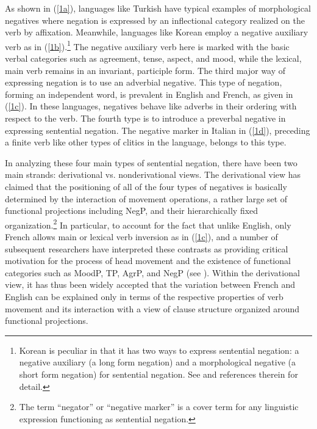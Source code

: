 \documentclass[output=paper
                ,modfonts
                		,nonflat
	        ,collection
	        ,collectionchapter
	        ,collectiontoclongg
 	        ,biblatex
                ,babelshorthands
                ,newtxmath
                ,draftmode
                ,colorlinks, citecolor=brown
]{./langsci/langscibook}
\begin{document}
{\noindent
As shown in (\ref{1a}), languages like Turkish
have typical examples of morphological negatives where
negation is expressed by an inflectional category realized on the
verb by affixation. Meanwhile, languages like Korean
 employ a negative auxiliary verb as in (\ref{1b}).\footnote{Korean
 is peculiar in that it has two ways to
 express sentential negation: a negative auxiliary (a long form
 negation)  and a morphological negative (a short form negation)
 for sentential negation. See \citet{Kim:00,Kim:16} and references therein for detail.}
  The negative auxiliary
 verb here is marked with the basic verbal categories such as agreement, tense, aspect, and mood, while the lexical, main verb remains in an invariant, participle form. The third major way of expressing negation is to use an adverbial
negative. This type of negation, forming an independent word, is prevalent in English and French, as given in (\ref{1c}). In these languages, negatives behave like adverbs in their ordering with respect to the verb. The fourth
type is to introduce a preverbal negative in
expressing sentential negation. The negative marker in Italian in (\ref{1d}), preceding a finite verb like other types of clitics in the language,
belongs to this type.


In analyzing these four main types of sentential negation, there have been two main strands: derivational vs. nonderivational views. The derivational view has claimed that the positioning of all of the
four types of negatives is basically determined by the interaction of movement
operations, a rather large set of functional projections including NegP,
and their hierarchically fixed organization.\footnote{The term ``negator'' or ``negative marker'' is a cover term for any linguistic expression functioning as sentential negation.}
In particular, to account for the
fact that unlike English, only French allows main or lexical verb inversion
as in (\ref{1c}), \citet{Pollock:89,Pollock:94} and a number of subsequent researchers
have interpreted these contrasts as providing critical motivation for
the process of head movement and the existence of functional
categories such as MoodP, TP, AgrP, and NegP (see \citealt{Belletti:90, Zanuttini:91, Zanuttini:97,Zanuttini:01, Chomsky:91,Chomsky:93,Chomsky:95, Lasnik:95, Haegeman:95,Haegeman:97, Vikner97a-u, Zeijlstra:15}).
Within the derivational view, it has thus been widely
accepted that the variation between French and English can be explained only in terms of the respective properties of verb movement and its interaction with a view of clause
structure organized around functional projections.


}
\end{document}
